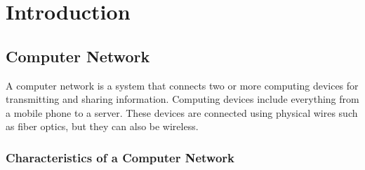 \chapter{Introduction}

\section{Computer Network}
A computer network is a system that connects two or more computing devices for transmitting and sharing information. Computing devices include everything from a mobile phone to a server. These devices are connected using physical wires such as fiber optics, but they can also be wireless.

\subsection{Characteristics of a Computer Network}
